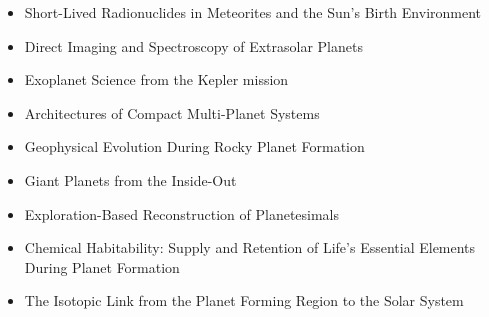 \documentclass[11pt]{article}
\begin{document}
\begin{itemize}
 \item Short-Lived Radionuclides in Meteorites and the Sun’s Birth Environment
 \item Direct Imaging and Spectroscopy of Extrasolar Planets
 \item Exoplanet Science from the Kepler mission
 \item Architectures of Compact Multi-Planet Systems
 \item Geophysical Evolution During Rocky Planet Formation
 \item Giant Planets from the Inside-Out
 \item Exploration-Based Reconstruction of Planetesimals
 \item Chemical Habitability: Supply and Retention of Life’s Essential Elements During Planet Formation
 \item The Isotopic Link from the Planet Forming Region to the Solar System
\end{itemize}





\end{document}

